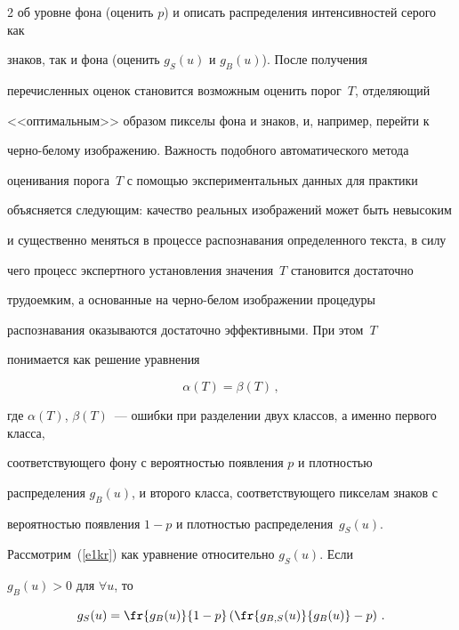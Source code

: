 \begin{multicols}{2}
об уровне фона (оценить $p$) и описать распределения интенсивностей серого как 


знаков, так и фона (оценить $g_S(u)$ и $g_B(u)$). После получения 


перечисленных оценок становится возможным оценить порог~$T$, отделяющий 


<<оптимальным>> образом пикселы фона и знаков, и, например, перейти к 


     черно-белому изображению. Важность подобного автоматического метода 


оценивания порога~$T$ с помощью экспериментальных данных для практики 


объясняется следующим: качество реальных изоб\-ра\-же\-ний может быть невысоким 


и существенно меняться в процессе распознавания определенного текста, в силу 


чего процесс экспертного установления значения~$T$ становится достаточно 


трудоемким, а основанные на черно-белом изображении процедуры 


распознавания оказываются достаточно эффективными. При этом~$T$ 


понимается как решение уравнения 





\noindent


$$


\alpha (T) =\beta (T)\,,


$$ 


где $\alpha (T)$, $\beta 


(T)$~--- ошибки при разделении двух классов, а именно первого класса, 


соответствующего фону с вероятностью появления $p$ и плотностью 


распределения $g_B(u)$, и второго класса, соответствующего пикселам знаков с 


вероятностью появления $1-p$ и плотностью распределения~$g_S(u)$.


     


     Рассмотрим~(\ref{e1kr}) как уравнение относительно $g_S(u)$. Если 


$g_B(u)>0$ для $\forall u$, то 


     $$


     g_S (u) = \fr{g_B(u)}{1-p}\left (\fr{g_{B,S}(u)}{g_B(u)} -p\right )\,.


     $$



\end{multicols}
